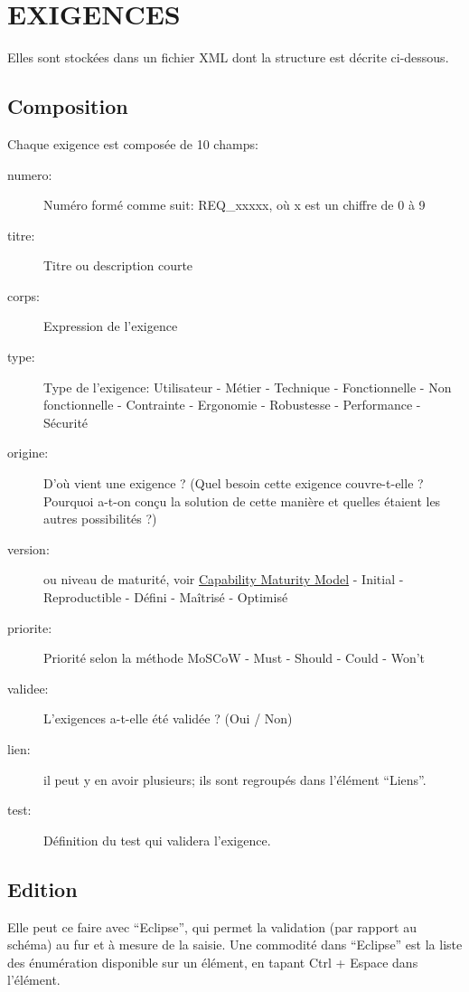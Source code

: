 \documentclass[11pt,a4paper,french,twoside,openright]{article}
\begin{document}
\section{EXIGENCES}\label{exigences}
Elles sont stockées dans un fichier XML dont la structure est décrite ci-dessous.
\subsection{Composition}\label{composition}
Chaque exigence est composée de 10 champs:
\begin{description}
\item[numero:] Numéro formé comme suit: REQ\_xxxxx, où x est un chiffre de 0 à 9
\item[titre:] Titre ou description courte
\item[corps:] Expression de l'exigence
\item[type:] Type de l'exigence: Utilisateur - Métier - Technique - Fonctionnelle - Non fonctionnelle - Contrainte - Ergonomie - Robustesse - Performance - Sécurité
\item[origine:] D'où vient une exigence ? (Quel besoin cette exigence couvre-t-elle ? Pourquoi a-t-on conçu la solution de cette manière et quelles étaient les autres possibilités ?)
\item[version:] ou niveau de maturité, voir \href{http://users.polytech.unice.fr/~hugues/GL/CMM/cmm.html}{Capability Maturity Model} - Initial - Reproductible - Défini - Maîtrisé - Optimisé
\item[priorite:] Priorité selon la méthode MoSCoW - Must - Should - Could - Won't
\item[validee:] L'exigences a-t-elle été validée ? (Oui / Non)
\item[lien:] il peut y en avoir plusieurs; ils sont regroupés dans l'élément ``Liens''.
\item[test:] Définition du test qui validera l'exigence.
\end{description}

\subsection{Edition}\label{edition}

Elle peut ce faire avec \enquote{Eclipse}, qui permet la validation (par
rapport au schéma) au fur et à mesure de la saisie. Une commodité dans
\enquote{Eclipse} est la liste des énumération disponible sur un élément, en
tapant Ctrl + Espace dans l'élément.
\end{document}
